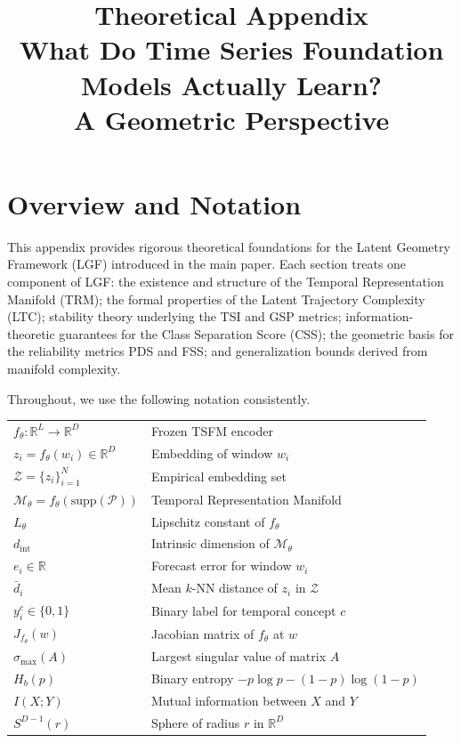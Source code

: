 \documentclass[12pt]{article}
\title{\textbf{Theoretical Appendix}\\[0.4em]
  \large What Do Time Series Foundation Models Actually Learn?\\
  A Geometric Perspective}
\date{}
\theoremstyle{definition}
\theoremstyle{remark}
\newcommand{\R}{\mathbb{R}}
\newcommand{\Zset}{\mathcal{Z}}
\newcommand{\Pset}{\mathcal{P}}
\newcommand{\trm}{\mathcal{M}_\theta}
\newcommand{\dint}{d_{\mathrm{int}}}
\newcommand{\smax}{\sigma_{\max}}
\begin{document}
\maketitle
\tableofcontents
\newpage

\section*{Overview and Notation}

This appendix provides rigorous theoretical foundations for the Latent
Geometry Framework (LGF) introduced in the main paper. Each section treats
one component of LGF: the existence and structure of the Temporal
Representation Manifold (TRM); the formal properties of the Latent
Trajectory Complexity (LTC); stability theory underlying the TSI and GSP
metrics; information-theoretic guarantees for the Class Separation Score
(CSS); the geometric basis for the reliability metrics PDS and FSS; and
generalization bounds derived from manifold complexity.

Throughout, we use the following notation consistently.

\bigskip
\noindent
\begin{tabular}{lp{10cm}}
$f_\theta : \R^L \to \R^D$ & Frozen TSFM encoder\\
$z_i = f_\theta(w_i) \in \R^D$ & Embedding of window $w_i$\\
$\Zset = \{z_i\}_{i=1}^N$ & Empirical embedding set\\
$\trm = f_\theta(\mathrm{supp}(\Pset))$ & Temporal Representation Manifold\\
$L_\theta$ & Lipschitz constant of $f_\theta$\\
$\dint$ & Intrinsic dimension of $\trm$\\
$e_i \in \R$ & Forecast error for window $w_i$\\
$\bar{d}_i$ & Mean $k$-NN distance of $z_i$ in $\Zset$\\
$y^c_i \in \{0,1\}$ & Binary label for temporal concept $c$\\
$J_{f_\theta}(w)$ & Jacobian matrix of $f_\theta$ at $w$\\
$\smax(A)$ & Largest singular value of matrix $A$\\
$H_b(p)$ & Binary entropy $-p\log p - (1-p)\log(1-p)$\\
$I(X;Y)$ & Mutual information between $X$ and $Y$\\
$S^{D-1}(r)$ & Sphere of radius $r$ in $\R^D$\\
\end{tabular}
\end{document}
